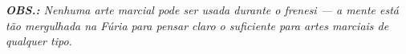 
\begin{multicols}{2}






\textit{{\bf OBS.: } Nenhuma arte marcial pode ser usada durante o frenesi — a mente está tão mergulhada na Fúria para pensar claro o suficiente para artes marciais de qualquer tipo.}


%
%


%




%
\end{multicols}




